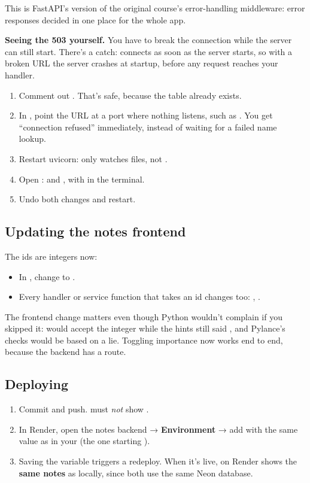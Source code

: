This is FastAPI's version of the original course's error-handling middleware: error responses decided in one place for the whole app.

\textbf{Seeing the 503 yourself.} You have to break the connection while the server can still start. There's a catch:  connects as soon as the server starts, so with a broken URL the server crashes at startup, before any request reaches your handler.
\begin{enumerate}
\item Comment out . That's safe, because the table already exists.
\item In , point the URL at a port where nothing listens, such as . You get ``connection refused'' immediately, instead of waiting for a failed name lookup.
\item Restart uvicorn:  only watches  files, not .
\item Open :  and , with  in the terminal.
\item Undo both changes and restart.
\end{enumerate}

\subsection{Updating the notes frontend}

The ids are integers now:
\begin{itemize}
\item In , change  to .
\item Every handler or service function that takes an id changes too: , .
\end{itemize}
The frontend change matters even though Python wouldn't complain if you skipped it:  would accept the integer while the hints still said , and Pylance's checks would be based on a lie. Toggling importance now works end to end, because the backend has a  route.

\subsection{Deploying}

\begin{enumerate}
\item Commit and push.  must \emph{not} show .
\item In Render, open the notes backend → \textbf{Environment} → add  with the same value as in your  (the one starting ).
\item Saving the variable triggers a redeploy. When it's live,  on Render shows the \textbf{same notes} as locally, since both use the same Neon database.
\end{enumerate}


